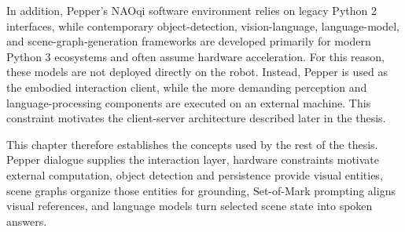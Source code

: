 In addition, Pepper's NAOqi software environment relies on legacy Python 2 interfaces, while contemporary ob\-ject-de\-tec\-tion, vi\-sion-lan\-guage, lan\-guage-mod\-el, and scene-graph-gen\-er\-a\-tion frameworks are developed primarily for modern Python 3 ecosystems and often assume hardware acceleration. For this reason, these models are not deployed directly on the robot. Instead, Pepper is used as the embodied interaction client, while the more demanding perception and lan\-guage-pro\-cess\-ing components are executed on an external machine. This constraint motivates the cli\-ent-serv\-er architecture described later in the thesis.

This chapter therefore establishes the concepts used by the rest of the thesis. Pepper dialogue supplies the interaction layer, hardware constraints motivate external computation, object detection and persistence provide visual entities, scene graphs organize those entities for grounding, Set-of-Mark prompting aligns visual references, and language models turn selected scene state into spoken answers.
